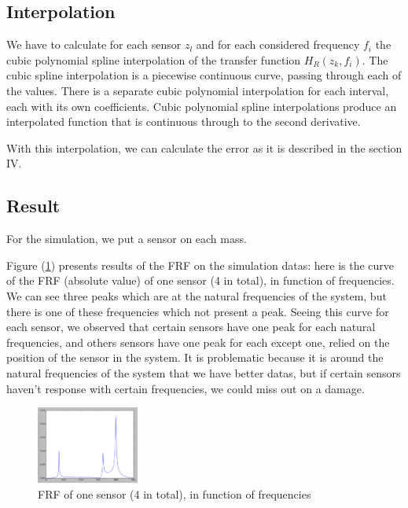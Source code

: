 \documentclass[journal]{IEEEtran}
\begin{document}
\subsection{Interpolation}

We have to calculate for each sensor $z_l$ and for each considered frequency $f_i$ the cubic polynomial spline interpolation of the transfer function $H_R(z_k,f_i)$.
The cubic spline interpolation is a piecewise continuous curve, passing through each of the values.
There is a separate cubic polynomial interpolation for each interval, each with its own coefficients.
Cubic polynomial spline interpolations produce an interpolated function that is continuous through to the second derivative.

With this interpolation, we can calculate the error as it is described in the section IV.

\subsection{Result}

For the simulation, we put a sensor on each mass.

Figure (\ref{frf_freq}) presents results of the FRF on the simulation datas: here is the curve of the FRF (absolute value) of one sensor (4 in total), in function of frequencies. We can see three peaks which are at the natural frequencies of the system, but there is one of these frequencies which not present a peak. Seeing this curve for each sensor, we observed that certain sensors have one peak for each natural frequencies, and others sensors have one peak for each except one, relied on the position of the sensor in the system. It is problematic because it is around the natural frequencies of the system that we have better datas, but if certain sensors haven't response with certain frequencies, we could miss out on a damage.


\begin{figure}
  \centering
  \includegraphics[width=0.3\textwidth]{images/FRF_freq.png}
  \caption{FRF of one sensor (4 in total), in function of frequencies}
  \label{frf_freq}
\end{figure}
\end{document}
